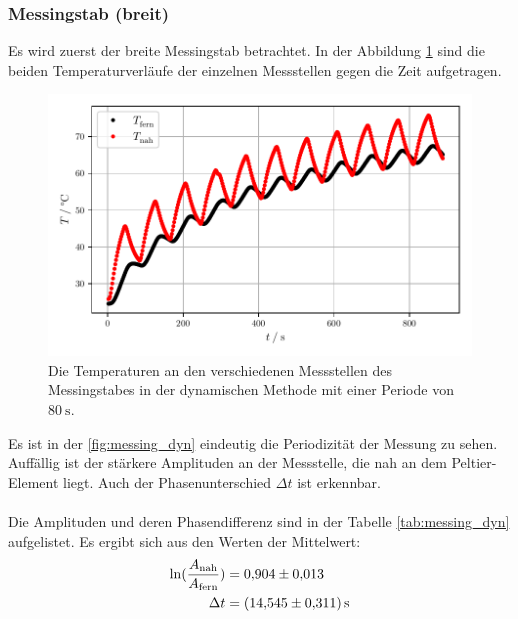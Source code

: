 \subsubsection{Messingstab (breit)}
Es wird zuerst der breite Messingstab betrachtet. 
In der Abbildung \ref{fig:messing_dyn} sind die beiden Temperaturverläufe der einzelnen Messstellen gegen die Zeit aufgetragen.
\begin{figure}[H]
  \centering
  \includegraphics{build/plot_messing.pdf}
  \caption{Die Temperaturen an den verschiedenen Messstellen des Messingstabes in der dynamischen Methode mit einer Periode von $\SI{80}{\second}$.}
  \label{fig:messing_dyn}
\end{figure}
Es ist in der \autoref{fig:messing_dyn} eindeutig die Periodizität der Messung zu sehen.
Auffällig ist der stärkere Amplituden an der Messstelle, die nah an dem Peltier-Element liegt.
Auch der Phasenunterschied $\Delta t$ ist erkennbar.\\
\\
Die Amplituden und deren Phasendifferenz sind in der Tabelle \ref{tab:messing_dyn} aufgelistet.
Es ergibt sich aus den Werten der Mittelwert:
\begin{align*}
  \ln(\frac{A_{\text{nah}}}{A_{\text{fern}}}) &= \num{0.904 \pm 0.013}\\
  \Delta t &= \SI{14.545 \pm 0.311}{\second}
\end{align*} 

